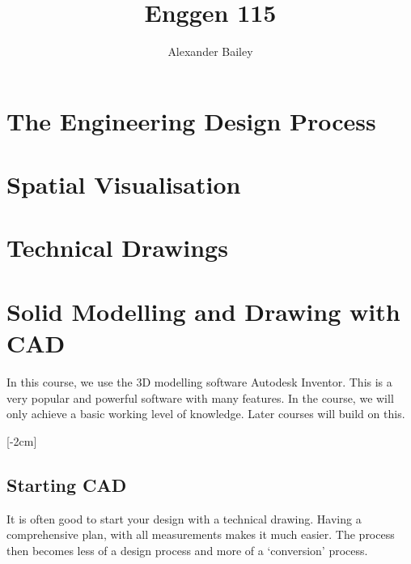 \documentclass[12pt]{article}
\begin{document}
\title{Enggen 115}
\author{Alexander Bailey}
\maketitle
\flushbottom

\section{The Engineering Design Process}
\section{Spatial Visualisation}
\section{Technical Drawings}
\section{Solid Modelling and Drawing with CAD}
In this course, we use the 3D modelling software Autodesk Inventor.
This is a very popular and powerful software with many features.
In the course, we will only achieve a basic working level of knowledge. 
Later courses will build on this.

[-2cm]

\subsection{Starting CAD}
It is often good to start your design with a technical drawing.
Having a comprehensive plan, with all measurements makes it much easier.
The process then becomes less of a design process and more of a `conversion' process.  
\end{document}

